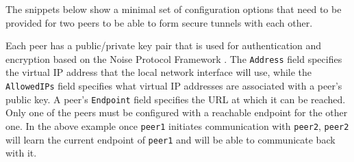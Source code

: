 The snippets below show a minimal set of configuration options that need
to be provided for two peers to be able to form secure tunnels with each
other.

\begin{Shaded}
\begin{Highlighting}[]
\KeywordTok{[Interface]}
\OtherTok{=}
\OtherTok{=}\StringTok{ }
\OtherTok{=}

\KeywordTok{[Peer]}
\OtherTok{=}
\OtherTok{=}
\OtherTok{=}
\end{Highlighting}
\end{Shaded}

\begin{Shaded}
\begin{Highlighting}[]
\KeywordTok{[Interface]}
\OtherTok{=}
\OtherTok{=}\StringTok{ }
\OtherTok{=}

\KeywordTok{[Peer]}
\OtherTok{=}
\OtherTok{=}
\end{Highlighting}
\end{Shaded}

Each peer has a public/private key pair that is used for authentication
and encryption based on the Noise Protocol Framework
\autocite{noiseDocs}. The \texttt{Address} field specifies the virtual
IP address that the local network interface will use, while the
\texttt{AllowedIPs} field specifies what virtual IP addresses are
associated with a peer's public key. A peer's \texttt{Endpoint} field
specifies the URL at which it can be reached. Only one of the peers must
be configured with a reachable endpoint for the other one. In the above
example once \texttt{peer1} initiates communication with \texttt{peer2},
\texttt{peer2} will learn the current endpoint of \texttt{peer1} and
will be able to communicate back with it.


